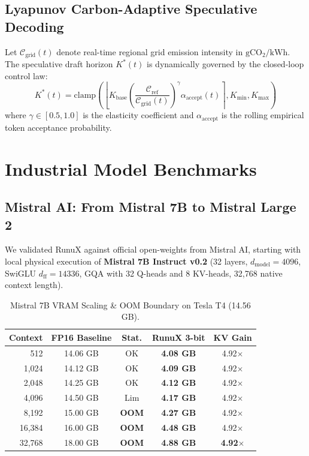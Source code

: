 \documentclass[10pt,twocolumn]{article}
\begin{document}
\subsection{Lyapunov Carbon-Adaptive Speculative Decoding}

Let $\mathcal{C}_{\mathrm{grid}}(t)$ denote real-time regional grid emission intensity in $\mathrm{gCO_2/kWh}$. The speculative draft horizon $K^*(t)$ is dynamically governed by the closed-loop control law:
\begin{equation}
    K^*(t) = \mathrm{clamp}\left( \left\lfloor K_{\mathrm{base}} \left(\frac{\mathcal{C}_{\mathrm{ref}}}{\mathcal{C}_{\mathrm{grid}}(t)}\right)^\gamma \alpha_{\mathrm{accept}}(t) \right\rceil, K_{\min}, K_{\max} \right)
\end{equation}
where $\gamma \in [0.5, 1.0]$ is the elasticity coefficient and $\alpha_{\mathrm{accept}}$ is the rolling empirical token acceptance probability.

\section{Industrial Model Benchmarks}

\subsection{Mistral AI: From Mistral 7B to Mistral Large 2}

We validated RunuX against official open-weights from Mistral AI, starting with local physical execution of \textbf{Mistral 7B Instruct v0.2} (32 layers, $d_{\mathrm{model}}=4096$, SwiGLU $d_{\mathrm{ff}}=14336$, GQA with 32 Q-heads and 8 KV-heads, 32,768 native context length).

\begin{table}[h]
\centering
\small
\caption{Mistral 7B VRAM Scaling \& OOM Boundary on Tesla T4 (14.56 GB).}
\label{tab:mistral_7b_oom}
\begin{tabular}{rcccc}
\toprule
\textbf{Context} & \textbf{FP16 Baseline} & \textbf{Stat.} & \textbf{RunuX 3-bit} & \textbf{KV Gain} \\
\midrule
512   & 14.06 GB & OK  & \textbf{4.08 GB} & 4.92$\times$ \\
1,024 & 14.12 GB & OK  & \textbf{4.09 GB} & 4.92$\times$ \\
2,048 & 14.25 GB & OK  & \textbf{4.12 GB} & 4.92$\times$ \\
4,096 & 14.50 GB & Lim & \textbf{4.17 GB} & 4.92$\times$ \\
8,192 & 15.00 GB & \textbf{OOM} & \textbf{4.27 GB} & 4.92$\times$ \\
16,384 & 16.00 GB & \textbf{OOM} & \textbf{4.48 GB} & 4.92$\times$ \\
32,768 & 18.00 GB & \textbf{OOM} & \textbf{4.88 GB} & \textbf{4.92$\times$} \\
\bottomrule
\end{tabular}
\end{table}
\end{document}
